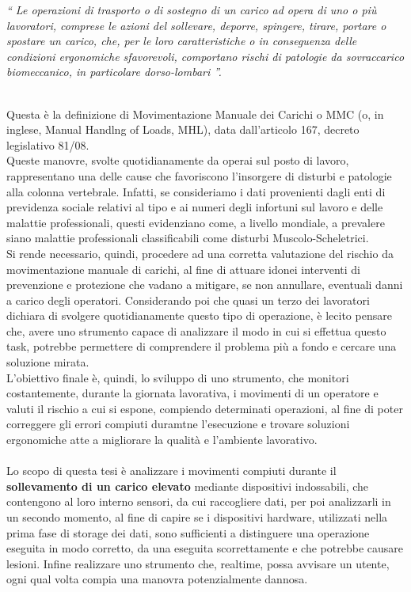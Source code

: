 \documentclass[a4paper]{article}
\begin{document}
\begin{addmargin}[1.5cm]{0cm}
\end{addmargin}
\begin{addmargin}{1.5cm}
\textit{“ Le operazioni di trasporto o di sostegno di un carico ad opera di uno o più
lavoratori, comprese le azioni del sollevare, deporre, spingere, tirare, portare o
spostare un carico, che, per le loro caratteristiche o in conseguenza delle
condizioni ergonomiche sfavorevoli, comportano rischi di patologie da
sovraccarico biomeccanico, in particolare dorso-lombari ”.} \\ \\
\end{addmargin}
Questa è la definizione di Movimentazione Manuale dei Carichi o MMC (o, in inglese, Manual Handlng of Loads, MHL), data dall'articolo 167, decreto legislativo 81/08. \\ Queste manovre, svolte quotidianamente da operai sul posto di lavoro, rappresentano una delle cause che favoriscono l’insorgere di disturbi e patologie alla colonna vertebrale. Infatti, se consideriamo i dati provenienti dagli enti di previdenza sociale relativi al tipo e ai numeri degli infortuni sul lavoro e delle malattie professionali, questi evidenziano come, a livello mondiale, a prevalere siano malattie professionali classificabili come disturbi Muscolo-Scheletrici. \\
Si rende necessario, quindi, procedere ad una corretta valutazione del rischio da movimentazione manuale di carichi, al fine di attuare idonei interventi di prevenzione e protezione che vadano a mitigare, se non annullare, eventuali danni a carico degli operatori. Considerando poi che quasi un terzo dei lavoratori dichiara di svolgere quotidianamente questo tipo di operazione, è lecito pensare che, avere uno strumento capace di analizzare il modo in cui si effettua questo task, potrebbe permettere di comprendere il problema più a fondo e cercare una soluzione mirata.\\
L'obiettivo finale è, quindi, lo sviluppo di uno strumento, che monitori costantemente, durante la giornata lavorativa, i movimenti di un operatore e valuti il rischio a cui si espone, compiendo determinati operazioni, al fine di poter correggere gli errori compiuti duramtne l'esecuzione e trovare soluzioni ergonomiche atte a migliorare la qualità e l'ambiente lavorativo.\\ \\
Lo scopo di questa tesi è analizzare i movimenti compiuti durante il \textbf{sollevamento di un carico elevato} mediante dispositivi indossabili, che contengono al loro interno sensori, da cui raccogliere dati, per poi analizzarli in un secondo momento, al fine di capire se i dispositivi hardware, utilizzati nella prima fase di storage dei dati, sono sufficienti a distinguere una operazione eseguita in modo corretto, da una eseguita scorrettamente e che potrebbe causare lesioni. Infine realizzare uno strumento che, realtime, possa avvisare un utente, ogni qual volta compia una manovra potenzialmente dannosa.
\end{document}
